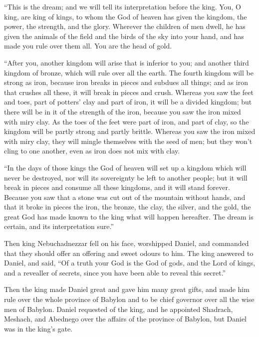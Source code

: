  ``This is the dream; and we will tell its interpretation
before the king.  You, O king, are king of kings, to whom
the God of heaven has given the kingdom, the power, the strength, and
the glory.  Wherever the children of men dwell, he has
given the animals of the field and the birds of the sky into your hand,
and has made you rule over them all. You are the head of gold.

 ``After you, another kingdom will arise that is inferior
to you; and another third kingdom of bronze, which will rule over all
the earth.  The fourth kingdom will be strong as iron,
because iron breaks in pieces and subdues all things; and as iron that
crushes all these, it will break in pieces and crush. 
Whereas you saw the feet and toes, part of potters' clay and part of
iron, it will be a divided kingdom; but there will be in it of the
strength of the iron, because you saw the iron mixed with miry clay.
 As the toes of the feet were part of iron, and part of
clay, so the kingdom will be partly strong and partly brittle.
 Whereas you saw the iron mixed with miry clay, they will
mingle themselves with the seed of men; but they won't cling to one
another, even as iron does not mix with clay.

 ``In the days of those kings the God of heaven will set
up a kingdom which will never be destroyed, nor will its sovereignty be
left to another people; but it will break in pieces and consume all
these kingdoms, and it will stand forever.  Because you
saw that a stone was cut out of the mountain without hands, and that it
broke in pieces the iron, the bronze, the clay, the silver, and the
gold, the great God has made known to the king what will happen
hereafter. The dream is certain, and its interpretation sure.''

 Then king Nebuchadnezzar fell on his face, worshipped
Daniel, and commanded that they should offer an offering and sweet
odours to him.  The king answered to Daniel, and said,
``Of a truth your God is the God of gods, and the Lord of kings, and a
revealler of secrets, since you have been able to reveal this secret.''

 Then the king made Daniel great and gave him many great
gifts, and made him rule over the whole province of Babylon and to be
chief governor over all the wise men of Babylon.  Daniel
requested of the king, and he appointed Shadrach, Meshach, and Abednego
over the affairs of the province of Babylon, but Daniel was in the
king's gate.

